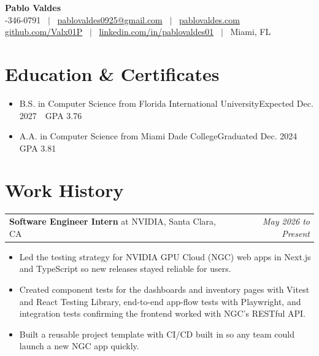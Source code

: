 \documentclass[letterpaper]{article}
\makeatletter
\newcommand{\entry}[3]{%
  \vspace{4pt}\needspace{4\baselineskip}
  \begin{tabular*}{\textwidth}{@{}l@{\extracolsep{\fill}}r@{}}
    \textbf{#1}#2 & \textit{#3} \\
  \end{tabular*}\par\vspace{1pt}}
\makeatother
\begin{document}
\begin{center}
  {\fontsize{18}{21}\selectfont\bfseries Pablo Valdes}\\[4pt]
  {\fontsize{10.5}{13}-346-0791 ~$|$~ \href{mailto:pablovaldes0925@gmail.com}{pablovaldes0925@gmail.com} ~$|$~ \href{https://pablovaldes.com}{pablovaldes.com}}\\[3pt]
  {\fontsize{10.5}{13}\selectfont \href{https://github.com/Valx01P}{github.com/Valx01P} ~$|$~ \href{https://linkedin.com/in/pablovaldes01}{linkedin.com/in/pablovaldes01} ~$|$~ Miami, FL}
\end{center}

\vspace{6pt}
\fontsize{10.5}{13.2}\selectfont

\section{Education \& Certificates}
\begin{itemize}
  \item {\rightskip=0pt B.S. in Computer Science from Florida International University\hfill Expected Dec. 2027 \,\textbar\, GPA 3.76\par}
  \item {\rightskip=0pt A.A. in Computer Science from Miami Dade College\hfill Graduated Dec. 2024 \,\textbar\, GPA 3.81\par}
\end{itemize}

\section{Work History}

\entry{Software Engineer Intern}{ at NVIDIA, Santa Clara, CA}{May 2026 to Present}
\begin{itemize}
  \item Led the testing strategy for NVIDIA GPU Cloud (NGC) web apps in Next.js and TypeScript so new releases stayed reliable for users.
  \item Created component tests for the dashboards and inventory pages with Vitest and React Testing Library, end-to-end app-flow tests with Playwright, and integration tests confirming the frontend worked with NGC's RESTful API.
  \item Built a reusable project template with CI/CD built in so any team could launch a new NGC app quickly.
\end{itemize}
\end{document}
